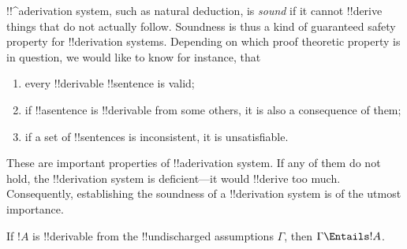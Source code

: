 \begin{explain}
!!^a{derivation} system, such as natural deduction, is \emph{sound}
if it cannot !!{derive} things that do not actually follow.  Soundness is
thus a kind of guaranteed safety property for !!{derivation} systems.
Depending on which proof theoretic property is in question, we would
like to know for instance, that
\begin{enumerate}
\item every !!{derivable} !!{sentence} is valid;
\item if !!a{sentence} is !!{derivable} from some others, it is also a
  consequence of them;
\item if a set of !!{sentence}s is inconsistent, it is unsatisfiable.
\end{enumerate}
These are important properties of !!a{derivation} system. If any of
them do not hold, the !!{derivation} system is deficient---it would
!!{derive} too much.  Consequently, establishing the soundness of a
!!{derivation} system is of the utmost importance.
\end{explain}

\begin{thm}[Soundness]
If $!A$ is !!{derivable} from the !!{undischarged} assumptions
$\Gamma$, then $\Gamma \Entails !A$.
\end{thm}

